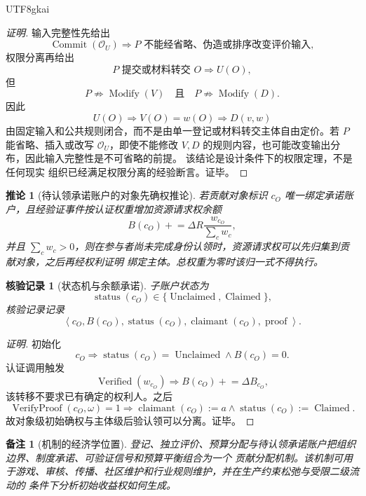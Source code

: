 \documentclass[12pt,a4paper,openany]{report}
\newtheorem{corollary}{推论}[chapter]
\newtheorem{remark}{备注}[chapter]
\newtheorem{Certificate}{核验记录}[chapter]
\newcommand{\Tuple}[1]{\left\langle #1\right\rangle}
\DeclareMathOperator{\Verified}{Verified}
\begin{document}
\begin{CJK*}{UTF8}{gkai}
\begin{proof}[证明]
输入完整性先给出
\[
  \operatorname{Commit}(\mathcal O_U)
  \Longrightarrow
  P\text{ 不能经省略、伪造或排序改变评价输入},
\]
权限分离再给出
\[
  P\text{ 提交或材料转交 }O
  \Longrightarrow U(O),
\]
但
\[
  P\not\Longrightarrow\operatorname{Modify}(V)
  \quad\text{且}\quad
  P\not\Longrightarrow\operatorname{Modify}(D).
\]
因此
\[
  U(O)\Longrightarrow V(O)=w(O)
  \Longrightarrow D(v,w)
\]
由固定输入和公共规则闭合，而不是由单一登记或材料转交主体自由定价。若 \(P\) 能省略、插入或改写
\(\mathcal O_U\)，即使不能修改 \(V,D\) 的规则内容，也可能改变输出分布，因此输入完整性是不可省略的前提。
该结论是设计条件下的权限定理，不是任何现实
组织已经满足权限分离的经验断言。证毕。
\end{proof}

\begin{corollary}[待认领承诺账户的对象先确权推论]
\label{cor:unclaimed-subaccount}
若贡献对象标识 \(c_O\) 唯一绑定承诺账户，且经验证事件按认证权重增加资源请求权余额
\[
  B(c_O)\mathrel{+}=
  \Delta R
  \frac{w_{c_O}}{\sum_{c}w_c},
\]
并且 \(\sum_cw_c>0\)，则在参与者尚未完成身份认领时，资源请求权可以先归集到贡献对象，之后再经权利证明
绑定主体。总权重为零时该归一式不得执行。
\end{corollary}

\begin{Certificate}[状态机与余额承诺]
子账户状态为
\[
  \operatorname{status}(c_O)\in
  \{\operatorname{Unclaimed},\operatorname{Claimed}\},
\]
核验记录记录
\[
  \Tuple{c_O,B(c_O),\operatorname{status}(c_O),
  \operatorname{claimant}(c_O),\operatorname{proof}}.
\]
\end{Certificate}

\begin{proof}[证明]
初始化
\[
  c_O\Longrightarrow
  \operatorname{status}(c_O)=\operatorname{Unclaimed}
  \wedge B(c_O)=0.
\]
认证调用触发
\[
  \Verified(w_{c_O})
  \Longrightarrow
  B(c_O)\mathrel{+}=\Delta B_{c_O},
\]
该转移不要求已有确定的权利人。之后
\[
  \operatorname{VerifyProof}(c_O,\omega)=1
  \Longrightarrow
  \operatorname{claimant}(c_O):=a
  \wedge
  \operatorname{status}(c_O):=\operatorname{Claimed}.
\]
故对象级初始确权与主体级后验认领可以分离。证毕。
\end{proof}

\begin{remark}[机制的经济学位置]
登记、独立评价、预算分配与待认领承诺账户把组织边界、制度承诺、可验证信号和预算平衡组合为一个
贡献分配机制。该机制可用于游戏、审核、传播、社区维护和行业规则维护，并在生产约束松弛与受限二级流动的
条件下分析初始收益权如何生成。
\end{remark}
\clearpage

\end{CJK*}
\end{document}
